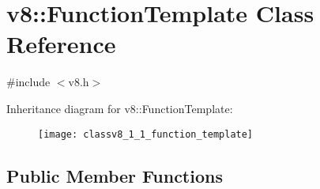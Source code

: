 \hypertarget{classv8_1_1_function_template}{}\section{v8\+:\+:Function\+Template Class Reference}
\label{classv8_1_1_function_template}


{\ttfamily \#include $<$v8.\+h$>$}

Inheritance diagram for v8\+:\+:Function\+Template\+:\begin{figure}[H]
\begin{center}
\leavevmode
\texttt{[image: classv8\_1\_1\_function\_template]}
\end{center}
\end{figure}
\subsection*{Public Member Functions}

